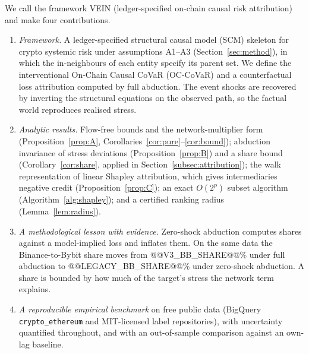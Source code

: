 \documentclass[referee,pdflatex,sn-mathphys-ay]{sn-jnl}
\theoremstyle{thmstyleone}%
\theoremstyle{thmstyletwo}%
\theoremstyle{thmstylethree}%
\begin{document}
We call the framework VEIN (ledger-specified on-chain causal risk attribution) and make four contributions.
\begin{enumerate}[label=(\roman*),leftmargin=*]
\item \emph{Framework.} A ledger-specified structural causal model (SCM) skeleton for crypto
systemic risk under assumptions A1--A3 (Section~\ref{sec:method}), in which the in-neighbours of
each entity specify its parent set. We define the interventional On-Chain Causal CoVaR
(OC-CoVaR) and a counterfactual loss attribution computed by full abduction. The event shocks
are recovered by inverting the structural equations on the observed path, so the factual world
reproduces realised stress.
\item \emph{Analytic results.} Flow-free bounds and the network-multiplier form (Proposition~\ref{prop:A},
Corollaries~\ref{cor:pure}--\ref{cor:bound}); abduction invariance of stress deviations
(Proposition~\ref{prop:B}) and a share bound (Corollary~\ref{cor:share}, applied in Section~\ref{subsec:attribution});
the walk representation of linear Shapley attribution, which gives intermediaries negative credit
(Proposition~\ref{prop:C}); an exact $O(2^p)$ subset algorithm (Algorithm~\ref{alg:shapley}); and a
certified ranking radius (Lemma~\ref{lem:radius}).
\item \emph{A methodological lesson with evidence.} Zero-shock abduction computes shares against a
model-implied loss and inflates them. On the same data the Binance-to-Bybit share moves from
@@V3_BB_SHARE@@\% under full abduction to @@LEGACY_BB_SHARE@@\% under zero-shock abduction. A share
is bounded by how much of the target's stress the network term explains.
\item \emph{A reproducible empirical benchmark} on free public data (BigQuery \texttt{crypto\_ethereum}
and MIT-licensed label repositories), with uncertainty quantified throughout, and with an
out-of-sample comparison against an own-lag baseline.
\end{enumerate}
\end{document}
